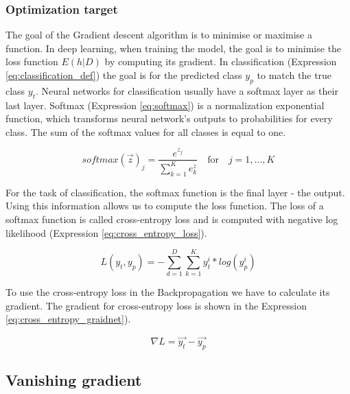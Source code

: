\documentclass[times, utf8, diplomski]{fer}
\begin{document}
\subsubsection{Optimization target}

The goal of the Gradient descent algorithm is to minimise or maximise a function. In deep learning, when training the model, the goal is to minimise the loss function $E(h|D)$ by computing its gradient. In classification (Expression \ref{eq:classification_def}) the goal is for the predicted class $y_p$ to match the true class $y_t$. Neural networks for classification usually have a softmax layer as their last layer. Softmax (Expression \ref{eq:softmax}) is a normalization exponential function, which transforms neural network's outputs to probabilities for every class. The sum of the softmax values for all classes is equal to one.  

\begin{equation}
\label{eq:softmax}
    softmax(\vec{z})_j = \frac{e^{z_j}}{\displaystyle\sum_{k=1}^{K} e^{z}_k} \quad \text{for} \quad j = 1, ..., K
\end{equation} 

For the task of classification, the softmax function is the final layer - the output. Using this information allows us to compute the loss function. The loss of a softmax function is called cross-entropy loss and is computed with negative log likelihood (Expression \ref{eq:cross_entropy_loss}).

\begin{equation}
\label{eq:cross_entropy_loss}
    L(y_t, y_p) = - \displaystyle\sum_{d=1}^{D} \sum_{k=1}^{K} y^i_t * log(y^i_p) 
\end{equation}

To use the cross-entropy loss in the Backpropagation we have to calculate its gradient. The gradient for cross-entropy loss is shown in the Expression \ref{eq:cross_entropy_graidnet}).

\begin{equation}
\label{eq:cross_entropy_graidnet}
 \nabla{L} = \vec{y_t} - \vec{y_p}
\end{equation}

\subsection{Vanishing gradient}
\label{se:vanishing_gradient}
\end{document}
